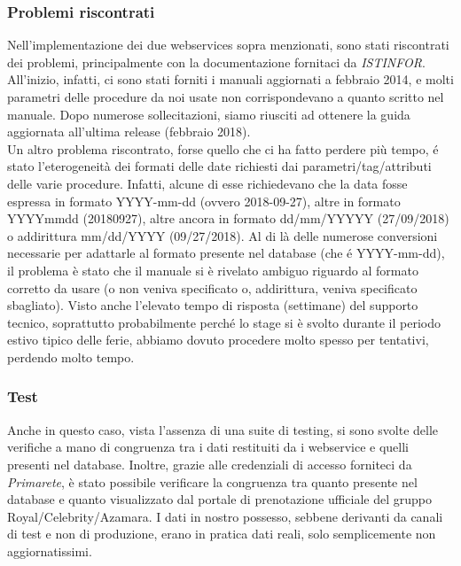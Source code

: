 \subsubsection{Problemi riscontrati}
Nell'implementazione dei due \glspl{webservice} sopra menzionati, sono stati riscontrati dei problemi, principalmente con la documentazione fornitaci da \textit{ISTINFOR}. All'inizio, infatti, ci sono stati forniti i manuali aggiornati a febbraio 2014, e molti parametri delle procedure da noi usate non corrispondevano a quanto scritto nel manuale. Dopo numerose sollecitazioni, siamo riusciti ad ottenere la guida aggiornata all'ultima release (febbraio 2018).\\
Un altro problema riscontrato, forse quello che ci ha fatto perdere più tempo, é stato l'eterogeneità dei formati delle date richiesti dai parametri/tag/attributi delle varie procedure. Infatti, alcune di esse richiedevano che la data fosse espressa in formato YYYY-mm-dd (ovvero 2018-09-27), altre in formato YYYYmmdd (20180927), altre ancora in formato dd/mm/YYYYY (27/09/2018) o addirittura mm/dd/YYYY (09/27/2018). Al di là delle numerose conversioni necessarie per adattarle al formato presente nel database (che é YYYY-mm-dd), il problema è stato che il manuale si è rivelato ambiguo riguardo al formato corretto da usare (o non veniva specificato o, addirittura, veniva specificato sbagliato). Visto anche l'elevato tempo di risposta (settimane) del supporto tecnico, soprattutto probabilmente perché lo stage si è svolto durante il periodo estivo tipico delle ferie, abbiamo dovuto procedere molto spesso per tentativi, perdendo molto tempo.

\subsubsection{Test}
Anche in questo caso, vista l'assenza di una suite di testing, si sono svolte delle verifiche a mano di congruenza tra i dati restituiti da i \gls{webservice} e quelli presenti nel database. Inoltre, grazie alle credenziali di accesso forniteci da \textit{Primarete}, è stato possibile verificare la congruenza tra quanto presente nel database e quanto visualizzato dal portale di prenotazione ufficiale del gruppo Royal/Celebrity/Azamara. I dati in nostro possesso, sebbene derivanti da canali di test e non di produzione, erano in pratica dati reali, solo semplicemente non aggiornatissimi.